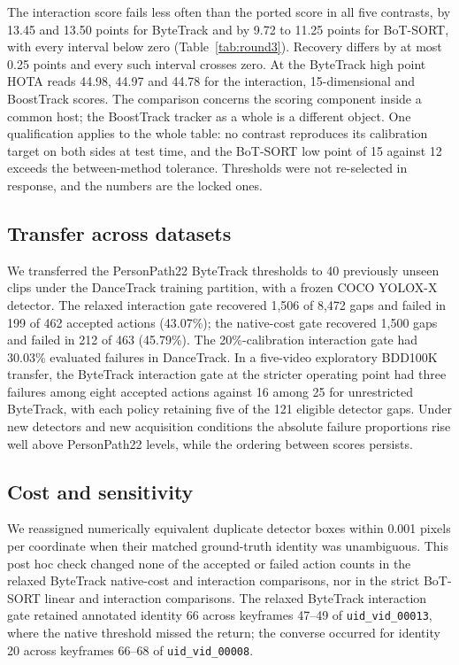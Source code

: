 The interaction score fails less often than the ported score in all five
contrasts, by 13.45 and 13.50 points for ByteTrack and by 9.72 to 11.25
points for BoT-SORT, with every interval below zero
(Table~\ref{tab:round3}). Recovery differs by at most 0.25 points and
every such interval crosses zero. At the ByteTrack high point HOTA reads
44.98, 44.97 and 44.78 for the interaction, 15-dimensional and BoostTrack
scores. The comparison concerns the scoring component inside a common
host; the BoostTrack tracker as a whole is a different object. One
qualification applies to the whole table: no contrast reproduces its
calibration target on both sides at test time, and the BoT-SORT low point
of 15 against 12 exceeds the between-method tolerance. Thresholds were not
re-selected in response, and the numbers are the locked ones.

\subsection{Transfer across datasets}
We transferred the PersonPath22 ByteTrack thresholds to 40 previously
unseen clips under the DanceTrack training partition, with a frozen COCO
YOLOX-X detector. The relaxed interaction gate recovered 1,506 of 8,472
gaps and failed in 199 of 462 accepted actions (43.07\%); the native-cost
gate recovered 1,500 gaps and failed in 212 of 463 (45.79\%). The
20\%-calibration interaction gate had 30.03\% evaluated failures in
DanceTrack. In a five-video exploratory BDD100K transfer, the ByteTrack
interaction gate at the stricter operating point had three failures among
eight accepted actions against 16 among 25 for unrestricted ByteTrack,
with each policy retaining five of the 121 eligible detector gaps. Under
new detectors and new acquisition conditions the absolute failure
proportions rise well above PersonPath22 levels, while the ordering
between scores persists.

\subsection{Cost and sensitivity}
We reassigned numerically equivalent duplicate detector boxes within 0.001
pixels per coordinate when their matched ground-truth identity was
unambiguous. This post hoc check changed none of the accepted or failed
action counts in the relaxed ByteTrack native-cost and interaction
comparisons, nor in the strict BoT-SORT linear and interaction
comparisons. The relaxed ByteTrack interaction gate retained annotated
identity 66 across keyframes 47--49 of \texttt{uid\_vid\_00013}, where the
native threshold missed the return; the converse occurred for identity 20
across keyframes 66--68 of \texttt{uid\_vid\_00008}.

